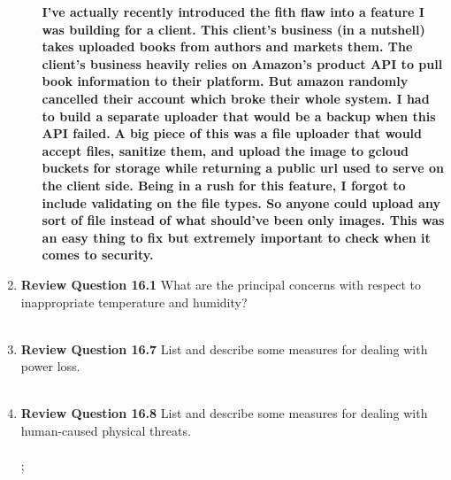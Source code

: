 \documentclass[12pt]{article}
\begin{document}
\begin{enumerate}
\begin{enumerate}
  \textbf{I've actually recently introduced the fith flaw into a feature I was building for a client. This client's business (in a nutshell) takes uploaded books from authors and markets them. The client's business heavily relies on Amazon's product API to pull book information to their platform. But amazon randomly cancelled their account which broke their whole system. I had to build a separate uploader that would be a backup when this API failed.}
  \textbf{A big piece of this was a file uploader that would accept files, sanitize them, and upload the image to gcloud buckets for storage while returning a public url used to serve on the client side. Being in a rush for this feature, I forgot to include validating on the file types. So anyone could upload any sort of file instead of what should've been only images. This was an easy thing to fix but extremely important to check when it comes to security.} \\

\end{enumerate}


  \item \textbf{Review Question 16.1} What are the principal concerns with respect to inappropriate temperature and humidity?\\

  \textbf{} \\

  \item \textbf{Review Question 16.7} List and describe some measures for dealing with power loss. \\

  \textbf{} \\

  \item \textbf{Review Question 16.8} List and describe some measures for dealing with human-caused physical threats. \\

  \textbf{} \\;

\end{enumerate}
\end{document}
